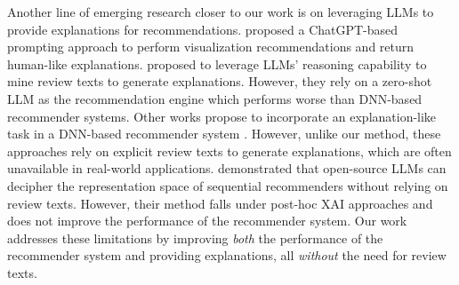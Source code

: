 
Another line of emerging research closer to our work is on leveraging LLMs to provide explanations for recommendations. \citet{wang2023llm4vis} proposed a ChatGPT-based prompting approach to perform visualization recommendations and return human-like explanations. \citet{tsai2024leveraging} proposed to leverage LLMs' reasoning capability to mine review texts to generate explanations. However, they rely on a zero-shot LLM as the recommendation engine which performs worse than DNN-based recommender systems.  Other works propose to incorporate an explanation-like task in a DNN-based recommender system \citep{li2023personalized, li2023prompt}. However, unlike our method, these approaches rely on explicit review texts to generate explanations, which are often unavailable in real-world applications. \citet{yang2023large} demonstrated that open-source LLMs can decipher the representation space of sequential recommenders without relying on review texts. However, their method falls under post-hoc XAI approaches and does not improve the performance of the recommender system. Our work addresses these limitations by improving \emph{both} the performance of the recommender system and providing explanations, all \emph{without} the need for review texts.


